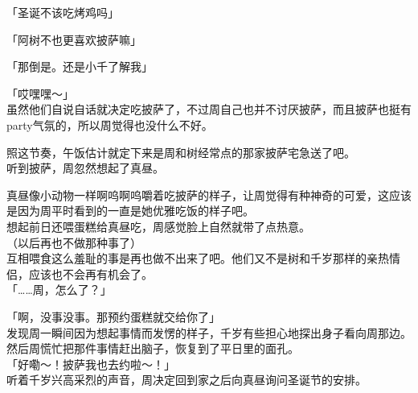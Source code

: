 「圣诞不该吃烤鸡吗」

「阿树不也更喜欢披萨嘛」

「那倒是。还是小千了解我」

「哎嘿嘿～」\\

虽然他们自说自话就决定吃披萨了，不过周自己也并不讨厌披萨，而且披萨也挺有party气氛的，所以周觉得也没什么不好。

照这节奏，午饭估计就定下来是周和树经常点的那家披萨宅急送了吧。\\

听到披萨，周忽然想起了真昼。

真昼像小动物一样啊呜啊呜嚼着吃披萨的样子，让周觉得有种神奇的可爱，这应该是因为周平时看到的一直是她优雅吃饭的样子吧。\\

想起前日还喂蛋糕给真昼吃，周感觉脸上自然就带了点热意。\\

（以后再也不做那种事了）\\

互相喂食这么羞耻的事是再也做不出来了吧。他们又不是树和千岁那样的亲热情侣，应该也不会再有机会了。\\

「……周，怎么了？」

「啊，没事没事。那预约蛋糕就交给你了」\\

发现周一瞬间因为想起事情而发愣的样子，千岁有些担心地探出身子看向周那边。然后周慌忙把那件事情赶出脑子，恢复到了平日里的面孔。\\

「好嘞～！披萨我也去约啦～！」\\

听着千岁兴高采烈的声音，周决定回到家之后向真昼询问圣诞节的安排。
